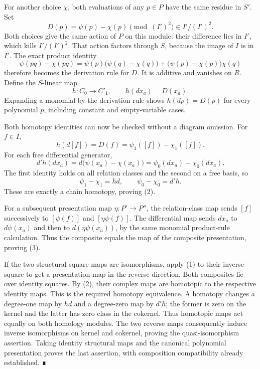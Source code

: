 \documentclass[11pt,a4paper,openany]{report}
\begin{document}
For another choice \(\chi\), both evaluations of any \(p\in P\) have the same residue in \(S'\). Set \[D(p)=\psi(p)-\chi(p)\pmod{(I')^2}\in I'/(I')^2.\] Both choices give the same action of \(P\) on this module: their difference lies in \(I'\), which kills \(I'/(I')^2\). That action factors through \(S\), because the image of \(I\) is in \(I'\). The exact product identity \[\psi(pq)-\chi(pq)
=\psi(p)\bigl(\psi(q)-\chi(q)\bigr)
 +\bigl(\psi(p)-\chi(p)\bigr)\chi(q)\] therefore becomes the derivation rule for \(D\). It is additive and vanishes on \(R\). Define the \(S\)-linear map \[h:C_0\longrightarrow C'_1,\qquad h(dx_a)=D(x_a).\] Expanding a monomial by the derivation rule shows \(h(dp)=D(p)\) for every polynomial \(p\), including constant and empty-variable cases.

Both homotopy identities can now be checked without a diagram omission. For \(f\in I\), \[h(d[f])=D(f)=\psi_1([f])-\chi_1([f]).\] For each free differential generator, \[d'h(dx_a)=d\bigl(\psi(x_a)-\chi(x_a)\bigr)
=\psi_0(dx_a)-\chi_0(dx_a).\] The first identity holds on all relation classes and the second on a free basis, so \[\psi_1-\chi_1=hd,\qquad \psi_0-\chi_0=d'h.\] These are exactly a chain homotopy, proving (2).

For a subsequent presentation map \(\eta:P'\to P''\), the relation-class map sends \([f]\) successively to \([\psi(f)]\) and \([\eta\psi(f)]\). The differential map sends \(dx_a\) to \(d\psi(x_a)\) and then to \(d(\eta\psi(x_a))\), by the same monomial product-rule calculation. Thus the composite equals the map of the composite presentation, proving (3).

If the two structural square maps are isomorphisms, apply (1) to their inverse square to get a presentation map in the reverse direction. Both composites lie over identity squares. By (2), their complex maps are homotopic to the respective identity maps. This is the required homotopy equivalence. A homotopy changes a degree-one map by \(hd\) and a degree-zero map by \(d'h\); the former is zero on the kernel and the latter has zero class in the cokernel. Thus homotopic maps act equally on both homology modules. The two reverse maps consequently induce inverse isomorphisms on kernel and cokernel, proving the quasi-isomorphism assertion. Taking identity structural maps and the canonical polynomial presentation proves the last assertion, with composition compatibility already established. ∎

\label{AG-RG-S05-algebra-lemma-Noetherian-field-extension}
\end{document}
